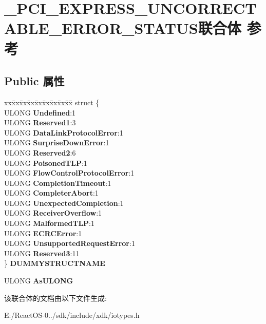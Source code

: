 \hypertarget{union___p_c_i___e_x_p_r_e_s_s___u_n_c_o_r_r_e_c_t_a_b_l_e___e_r_r_o_r___s_t_a_t_u_s}{}\section{\+\_\+\+P\+C\+I\+\_\+\+E\+X\+P\+R\+E\+S\+S\+\_\+\+U\+N\+C\+O\+R\+R\+E\+C\+T\+A\+B\+L\+E\+\_\+\+E\+R\+R\+O\+R\+\_\+\+S\+T\+A\+T\+U\+S联合体 参考}
\label{union___p_c_i___e_x_p_r_e_s_s___u_n_c_o_r_r_e_c_t_a_b_l_e___e_r_r_o_r___s_t_a_t_u_s}
\subsection*{Public 属性}
\begin{DoxyCompactItemize}
\item 
\mbox{\label{union___p_c_i___e_x_p_r_e_s_s___u_n_c_o_r_r_e_c_t_a_b_l_e___e_r_r_o_r___s_t_a_t_u_s_a19b25501982e84970b5219072e015aa7}} 
\begin{tabbing}
xx\=xx\=xx\=xx\=xx\=xx\=xx\=xx\=xx\=\kill
struct \{\\
\>ULONG {\bfseries Undefined}:1\\
\>ULONG {\bfseries Reserved1}:3\\
\>ULONG {\bfseries DataLinkProtocolError}:1\\
\>ULONG {\bfseries SurpriseDownError}:1\\
\>ULONG {\bfseries Reserved2}:6\\
\>ULONG {\bfseries PoisonedTLP}:1\\
\>ULONG {\bfseries FlowControlProtocolError}:1\\
\>ULONG {\bfseries CompletionTimeout}:1\\
\>ULONG {\bfseries CompleterAbort}:1\\
\>ULONG {\bfseries UnexpectedCompletion}:1\\
\>ULONG {\bfseries ReceiverOverflow}:1\\
\>ULONG {\bfseries MalformedTLP}:1\\
\>ULONG {\bfseries ECRCError}:1\\
\>ULONG {\bfseries UnsupportedRequestError}:1\\
\>ULONG {\bfseries Reserved3}:11\\
\} {\bfseries DUMMYSTRUCTNAME}\\

\end{tabbing}\item 
\mbox{\label{union___p_c_i___e_x_p_r_e_s_s___u_n_c_o_r_r_e_c_t_a_b_l_e___e_r_r_o_r___s_t_a_t_u_s_a692bf59f711c9fd5d9eaeeb1e685d650}} 
U\+L\+O\+NG {\bfseries As\+U\+L\+O\+NG}
\end{DoxyCompactItemize}


该联合体的文档由以下文件生成\+:\begin{DoxyCompactItemize}
\item 
E\+:/\+React\+O\+S-\/0../sdk/include/xdk/iotypes.\+h\end{DoxyCompactItemize}
